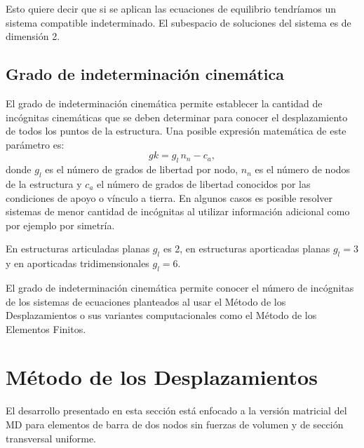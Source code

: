 Esto quiere decir que si se aplican las ecuaciones de equilibrio tendríamos un sistema compatible indeterminado. El subespacio de soluciones del sistema es de dimensión 2.




\subsection{Grado de indeterminación cinemática}

El grado de indeterminación cinemática permite establecer la cantidad de incógnitas cinemáticas que se deben determinar para conocer el desplazamiento de todos los puntos de la estructura.
%
Una posible expresión matemática de este parámetro es:
%
\begin{equation}
	gk = g_l \, n_n - c_a,
\end{equation}
%
donde $g_l$ es el número de grados de libertad por nodo, $n_n$ es el número de nodos de la estructura y $c_a$ el número de grados de libertad conocidos por las condiciones de apoyo o vínculo a tierra. %
%
En algunos casos es posible resolver sistemas de menor cantidad de incógnitas al utilizar información adicional como por ejemplo por simetría.

En estructuras articuladas planas $g_l$ es 2, en estructuras aporticadas planas $g_l=3$ y en aporticadas tridimensionales $g_l=6$.

El grado de indeterminación cinemática permite conocer el número de incógnitas de los sistemas de ecuaciones planteados al usar el Método de los Desplazamientos o sus variantes computacionales como el Método de los Elementos Finitos.








\section{Método de los Desplazamientos}

El desarrollo presentado en esta sección está enfocado a la versión matricial del MD para elementos de barra de dos nodos sin fuerzas de volumen y de sección transversal uniforme. %
%


